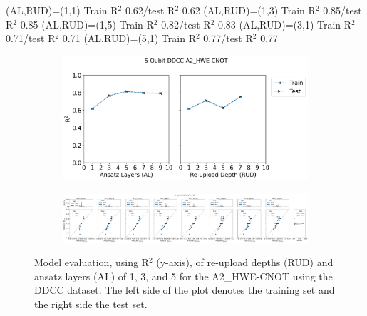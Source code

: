 \documentclass[journal=jacsat,manuscript=article]{achemso}
\begin{document}
(AL,RUD)=(1,1) Train R$^{2}$ 0.62/test R$^{2}$ 0.62
(AL,RUD)=(1,3) Train R$^{2}$ 0.85/test R$^{2}$ 0.85
(AL,RUD)=(1,5) Train R$^{2}$ 0.82/test R$^{2}$ 0.83
(AL,RUD)=(3,1) Train R$^{2}$ 0.71/test R$^{2}$ 0.71
(AL,RUD)=(5,1) Train R$^{2}$ 0.77/test R$^{2}$ 0.77



\begin{figure}[H]
	\centering	
	\begin{subfigure}[b]{0.49\textwidth}
		\centering
		\includegraphics[width=\linewidth]{../images/DDCC/DDCC_RUDAL_lineplot}
		\caption{}
		\label{fig:ddccRUDAL_lineplot}
	\end{subfigure}
	\hfill
	\begin{subfigure}[b]{\textwidth}
		\centering
		\includegraphics[width=\linewidth]{../images/DDCC/distribution_parity}
		\caption{}
		\label{fig:ddccdistribution_parity}
	\end{subfigure}
	\caption{Model evaluation, using R$^{2}$ (y-axis), of re-upload depths (RUD) and ansatz layers (AL) of 1, 3, and 5 for the A2\_HWE-CNOT using the DDCC dataset. The left side of the plot denotes the training set and the right side the test set.}
	\label{fig:ddcc_rud}	
\end{figure}
\end{document}
